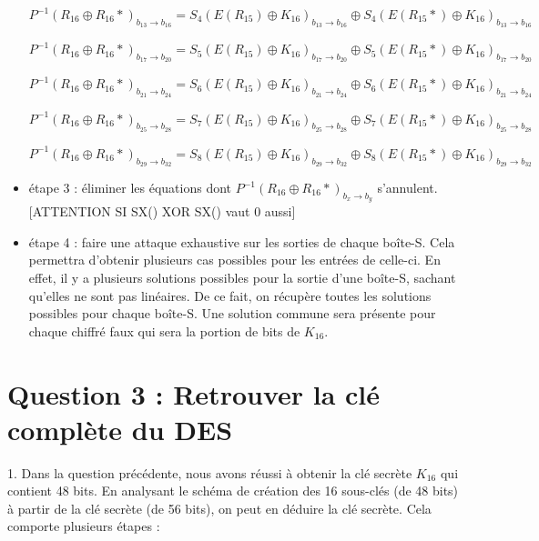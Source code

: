 \documentclass[11pt]{article}
\begin{document}
\begin{itemize}
	$P^{-1}(R_{16}\oplus R_{16}*)_{b_{13}\to b_{16}} = S_4(E(R_{15})\oplus K_{16})_{b_{13}\to b_{16}} \oplus S_4(E(R_{15}*)\oplus K_{16})_{b_{13}\to b_{16}}$
			
	$P^{-1}(R_{16}\oplus R_{16}*)_{b_{17}\to b_{20}} = S_5(E(R_{15})\oplus K_{16})_{b_{17}\to b_{20}} \oplus S_5(E(R_{15}*)\oplus K_{16})_{b_{17}\to b_{20}}$
				
	$P^{-1}(R_{16}\oplus R_{16}*)_{b_{21}\to b_{24}} = S_6(E(R_{15})\oplus K_{16})_{b_{21}\to b_{24}} \oplus S_6(E(R_{15}*)\oplus K_{16})_{b_{21}\to b_{24}}$
					
	$P^{-1}(R_{16}\oplus R_{16}*)_{b_{25}\to b_{28}} = S_7(E(R_{15})\oplus K_{16})_{b_{25}\to b_{28}} \oplus S_7(E(R_{15}*)\oplus K_{16})_{b_{25}\to b_{28}}$
						
	$P^{-1}(R_{16}\oplus R_{16}*)_{b_{29}\to b_{32}} = S_8(E(R_{15})\oplus K_{16})_{b_{29}\to b_{32}} \oplus S_8(E(R_{15}*)\oplus K_{16})_{b_{29}\to b_{32}}$ \newline
	
	\item étape 3 : éliminer les équations dont $P^{-1}(R_{16}\oplus R_{16}*)_{b_x\to b_y}$ s'annulent.
	[ATTENTION SI SX() XOR SX() vaut 0 aussi] \newline
	
	\item étape 4 : faire une attaque exhaustive sur les sorties de chaque boîte-S. Cela permettra d'obtenir plusieurs cas possibles pour les entrées de celle-ci. En effet, il y a plusieurs solutions possibles pour la sortie d'une boîte-S, sachant qu'elles ne sont pas linéaires. De ce fait, on récupère toutes les solutions possibles pour chaque boîte-S. Une solution commune sera présente pour chaque chiffré faux qui sera la portion de bits de $K_{16}$. 
	

\end{itemize}

\section{Question 3 : Retrouver la clé complète du DES}

1. Dans la question précédente, nous avons réussi à obtenir la clé secrète $K_{16}$ qui contient 48 bits. En analysant le schéma de création des 16 sous-clés (de 48 bits) à partir de la clé secrète (de 56 bits), on peut en déduire la clé secrète. Cela comporte plusieurs étapes : 
\end{document}
